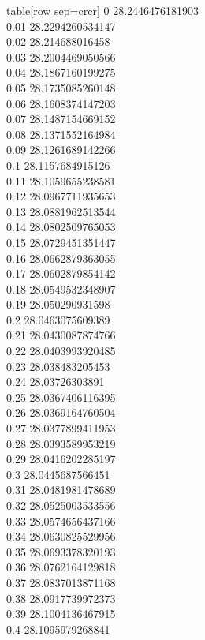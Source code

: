   table[row sep=crcr]{%
0	28.2446476181903\\
0.01	28.2294260534147\\
0.02	28.214688016458\\
0.03	28.2004469050566\\
0.04	28.1867160199275\\
0.05	28.1735085260148\\
0.06	28.1608374147203\\
0.07	28.1487154669152\\
0.08	28.1371552164984\\
0.09	28.1261689142266\\
0.1	28.1157684915126\\
0.11	28.1059655238581\\
0.12	28.0967711935653\\
0.13	28.0881962513544\\
0.14	28.0802509765053\\
0.15	28.0729451351447\\
0.16	28.0662879363055\\
0.17	28.0602879854142\\
0.18	28.0549532348907\\
0.19	28.050290931598\\
0.2	28.0463075609389\\
0.21	28.0430087874766\\
0.22	28.0403993920485\\
0.23	28.038483205453\\
0.24	28.03726303891\\
0.25	28.0367406116395\\
0.26	28.0369164760504\\
0.27	28.0377899411953\\
0.28	28.0393589953219\\
0.29	28.0416202285197\\
0.3	28.0445687566451\\
0.31	28.0481981478689\\
0.32	28.0525003533556\\
0.33	28.0574656437166\\
0.34	28.0630825529956\\
0.35	28.0693378320193\\
0.36	28.0762164129818\\
0.37	28.0837013871168\\
0.38	28.0917739972373\\
0.39	28.1004136467915\\
0.4	28.1095979268841\\
}
